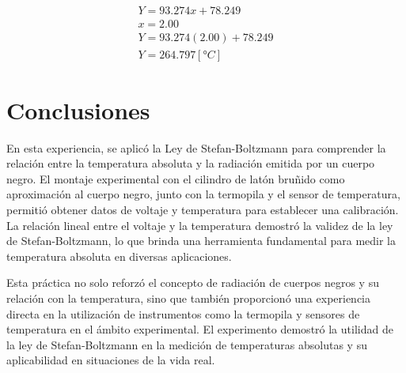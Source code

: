 \documentclass[letterpaper, 12pt]{article}
\begin{document}
\subsection{}

\begin{equation*}
      \begin{gathered}
            Y = 93.274 x + 78.249 \\
            x = 2.00 \\
            Y = 93.274 (2.00) + 78.249 \\
            Y = 264.797 [°C]
      \end{gathered}
\end{equation*}

\section{Conclusiones}

En esta experiencia, se aplicó la Ley de Stefan-Boltzmann
para comprender la relación entre la temperatura absoluta y
la radiación emitida por un cuerpo negro. El montaje
experimental con el cilindro de latón bruñido como
aproximación al cuerpo negro, junto con la termopila y el
sensor de temperatura, permitió obtener datos de voltaje y
temperatura para establecer una calibración. La relación
lineal entre el voltaje y la temperatura demostró la
validez de la ley de Stefan-Boltzmann, lo que brinda una
herramienta fundamental para medir la temperatura absoluta
en diversas aplicaciones.

Esta práctica no solo reforzó el concepto de radiación de
cuerpos negros y su relación con la temperatura, sino que
también proporcionó una experiencia directa en la
utilización de instrumentos como la termopila y sensores de
temperatura en el ámbito experimental. El experimento
demostró la utilidad de la ley de Stefan-Boltzmann en la
medición de temperaturas absolutas y su aplicabilidad en
situaciones de la vida real.

\printbibliography
\end{document}
